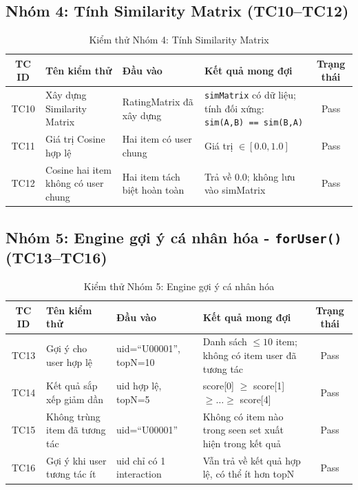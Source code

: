 \documentclass{report}
\begin{document}
\subsection{Nhóm 4: Tính Similarity Matrix (TC10--TC12)}

\begin{table}[H]
    \centering
    \renewcommand{\arraystretch}{1.4}
    \begin{tabularx}{\textwidth}{|c|>{\raggedright\arraybackslash}X|>{\raggedright\arraybackslash}X|>{\raggedright\arraybackslash}X|c|}
        \hline
        \textbf{TC ID} & \textbf{Tên kiểm thử} & \textbf{Đầu vào} & \textbf{Kết quả mong đợi} & \textbf{Trạng thái} \\ \hline
        TC10 & Xây dựng Similarity Matrix & RatingMatrix đã xây dựng & \texttt{simMatrix} có dữ liệu; tính đối xứng: \texttt{sim(A,B) == sim(B,A)} & Pass\\ \hline
        TC11 & Giá trị Cosine hợp lệ & Hai item có user chung & Giá trị $\in [0.0, 1.0]$ & Pass \\ \hline
        TC12 & Cosine hai item không có user chung & Hai item tách biệt hoàn toàn & Trả về $0.0$; không lưu vào simMatrix & Pass\\ \hline
    \end{tabularx}
    \caption{Kiểm thử Nhóm 4: Tính Similarity Matrix}
    \label{tab:tc_10_12}
\end{table}

\subsection{Nhóm 5: Engine gợi ý cá nhân hóa - \texttt{forUser()} (TC13--TC16)}

\begin{table}[H]
    \centering
    \renewcommand{\arraystretch}{1.4}
    \begin{tabularx}{\textwidth}{|c|>{\raggedright\arraybackslash}X|>{\raggedright\arraybackslash}X|>{\raggedright\arraybackslash}X|c|}
        \hline
        \textbf{TC ID} & \textbf{Tên kiểm thử} & \textbf{Đầu vào} & \textbf{Kết quả mong đợi} & \textbf{Trạng thái} \\ \hline
        TC13 & Gợi ý cho user hợp lệ & uid=``U00001'', topN=10 & Danh sách $\leq 10$ item; không có item user đã tương tác & Pass\\ \hline
        TC14 & Kết quả sắp xếp giảm dần & uid hợp lệ, topN=5 & score[0] $\geq$ score[1] $\geq \ldots \geq$ score[4] & Pass \\ \hline
        TC15 & Không trùng item đã tương tác & uid=``U00001'' & Không có item nào trong seen set xuất hiện trong kết quả & Pass \\ \hline
        TC16 & Gợi ý khi user tương tác ít & uid chỉ có 1 interaction & Vẫn trả về kết quả hợp lệ, có thể ít hơn topN & Pass \\ \hline
    \end{tabularx}
    \caption{Kiểm thử Nhóm 5: Engine gợi ý cá nhân hóa}
    \label{tab:tc_13_161}
\end{table}
\end{document}
